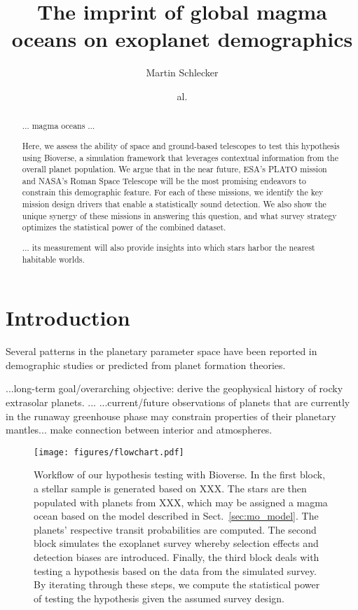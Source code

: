 \documentclass[modern]{aastex631}
\begin{document}
\title{The imprint of global magma oceans on exoplanet demographics}

\author[0000-0001-8355-2107]{Martin Schlecker}
\author{al.}


\begin{abstract}
    $\ldots$ magma oceans $\ldots$

    Here, we assess the ability of space and ground-based telescopes to test this hypothesis using Bioverse, a simulation framework that leverages contextual information from the overall planet population.
    We argue that in the near future, ESA's PLATO mission and NASA's Roman Space Telescope will be the most promising endeavors to constrain this demographic feature.
    For each of these missions, we identify the key mission design drivers that enable a statistically sound detection.
    We also show the unique synergy of these missions in answering this question, and what survey strategy optimizes the statistical power of the combined dataset.

    $\ldots$ its measurement will also provide insights into which stars harbor the nearest habitable worlds.
\end{abstract}

\section{Introduction}
Several patterns in the planetary parameter space have been reported in demographic studies or predicted from planet formation theories.
\begin{note}
    ...long-term goal/overarching objective: derive the geophysical history of rocky extrasolar planets.
   ...
    ...current/future observations of planets that are currently in the runaway greenhouse phase may constrain properties of their planetary mantles... make connection between interior and atmospheres.
\end{note}

\begin{figure*}
    \begin{centering}
        \texttt{[image: figures/flowchart.pdf]}
        \caption{Workflow of our hypothesis testing with Bioverse. In the first block, a stellar sample is generated based on XXX. The stars are then populated with planets from XXX, which may be assigned a magma ocean based on the model described in Sect.~\ref{sec:mo_model}. The planets' respective transit probabilities are computed. The second block simulates the exoplanet survey whereby selection effects and detection biases are introduced. Finally, the third block deals with testing a hypothesis based on the data from the simulated survey. By iterating through these steps, we compute the statistical power of testing the hypothesis given the assumed survey design.}
        \label{fig:flowchart}
    \end{centering}
\end{figure*}
\end{document}
